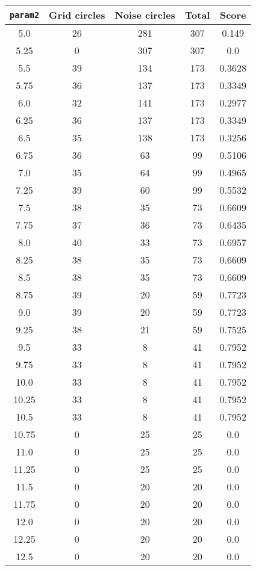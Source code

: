\documentclass[letterpaper, 12pt]{article}
\begin{document}
\begin{longtable}{|c|c|c|c|c|}
\hline
\textbf{\texttt{param2}} & \textbf{Grid circles} & \textbf{Noise circles} & \textbf{Total} & \textbf{Score} \\
\hline
5.0 & 26 & 281 & 307 & 0.149 \\
\hline
5.25 & 0 & 307 & 307 & 0.0 \\
\hline
5.5 & 39 & 134 & 173 & 0.3628 \\
\hline
5.75 & 36 & 137 & 173 & 0.3349 \\
\hline
6.0 & 32 & 141 & 173 & 0.2977 \\
\hline
6.25 & 36 & 137 & 173 & 0.3349 \\
\hline
6.5 & 35 & 138 & 173 & 0.3256 \\
\hline
6.75 & 36 & 63 & 99 & 0.5106 \\
\hline
7.0 & 35 & 64 & 99 & 0.4965 \\
\hline
7.25 & 39 & 60 & 99 & 0.5532 \\
\hline
7.5 & 38 & 35 & 73 & 0.6609 \\
\hline
7.75 & 37 & 36 & 73 & 0.6435 \\
\hline
8.0 & 40 & 33 & 73 & 0.6957 \\
\hline
8.25 & 38 & 35 & 73 & 0.6609 \\
\hline
8.5 & 38 & 35 & 73 & 0.6609 \\
\hline
8.75 & 39 & 20 & 59 & 0.7723 \\
\hline
9.0 & 39 & 20 & 59 & 0.7723 \\
\hline
9.25 & 38 & 21 & 59 & 0.7525 \\
\hline
9.5 & 33 & 8 & 41 & 0.7952 \\
\hline
9.75 & 33 & 8 & 41 & 0.7952 \\
\hline
10.0 & 33 & 8 & 41 & 0.7952 \\
\hline
10.25 & 33 & 8 & 41 & 0.7952 \\
\hline
10.5 & 33 & 8 & 41 & 0.7952 \\
\hline
10.75 & 0 & 25 & 25 & 0.0 \\
\hline
11.0 & 0 & 25 & 25 & 0.0 \\
\hline
11.25 & 0 & 25 & 25 & 0.0 \\
\hline
11.5 & 0 & 20 & 20 & 0.0 \\
\hline
11.75 & 0 & 20 & 20 & 0.0 \\
\hline
12.0 & 0 & 20 & 20 & 0.0 \\
\hline
12.25 & 0 & 20 & 20 & 0.0 \\
\hline
12.5 & 0 & 20 & 20 & 0.0 \\

\end{longtable}
\end{document}
